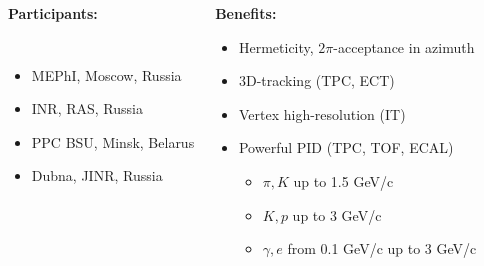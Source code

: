 \documentclass[dvipsnames] {beamer}
\begin{document}
\begin{frame}
\begin{columns}[t]
{\begin{block}{\bf \centering Participants:}
\begin{columns}[t]
                       \vskip -0.3cm
                       \begin{itemize}
                       \item MEPhI, Moscow, Russia 
                       \item INR, RAS, Russia
                       \item PPC BSU, Minsk, Belarus
                       \item Dubna, JINR, Russia
                       \end{itemize}           
                     \end{columns}
                   \end{block}
                 }
                 
                        {\tiny
                          \vskip -0.5cm
                          \begin{block}{\bf \centering Benefits:}
                            \begin{itemize}
                            \item Hermeticity, $2\pi$-acceptance in azimuth
                            \item 3D-tracking (TPC, ECT)
                            \item Vertex high-resolution (IT)
                            \item Powerful PID (TPC, TOF, ECAL)
                              \begin{itemize}
                              \item  {\tiny$\pi, K$ up to 1.5 GeV/c}
                              \item {\tiny$K, p$ up to 3 GeV/c}
                              \item {\tiny$\gamma, e$ from 0.1 GeV/c up to 3 GeV/c}
                              \end{itemize}

\end{itemize}
\end{block}}
\end{columns}
\end{frame}
\end{document}
